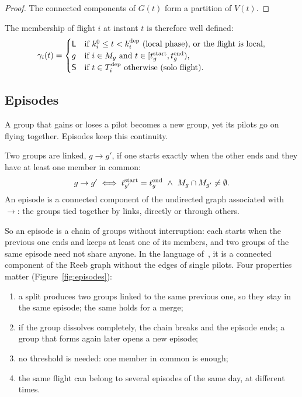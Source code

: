 \begin{proof}
The connected components of $G(t)$ form a partition of $V(t)$.
\end{proof}

The membership of flight $i$ at instant $t$ is therefore well defined:
\begin{equation}\label{eq:membership}
  \gamma_i(t)=\begin{cases}
    \textsf{L} & \text{if } k^0_i\le t<k^{\mathrm{dep}}_i \text{ (local phase), or the flight is local},\\
    g & \text{if } i\in M_g \text{ and } t\in[t^{\rm start}_g,t^{\rm end}_g),\\
    \textsf{S} & \text{if } t\in T^{\mathrm{dep}}_i \text{ otherwise (solo flight).}
  \end{cases}
\end{equation}

\subsection{Episodes}\label{sec:episodes}

A group that gains or loses a pilot becomes a new group, yet its pilots go on flying together.
Episodes keep this continuity.

\begin{definition}[episode]
Two groups are linked, $g\to g'$, if one starts exactly when the other ends and they have at
least one member in common:
\begin{equation}\label{eq:link}
  g\to g' \iff t^{\rm start}_{g'}=t^{\rm end}_g\ \wedge\ M_g\cap M_{g'}\ne\emptyset .
\end{equation}
An episode is a connected component of the undirected graph associated with $\to$: the groups
tied together by links, directly or through others.
\end{definition}

So an episode is a chain of groups without interruption: each starts when the previous one ends
and keeps at least one of its members, and two groups of the same episode need not share anyone.
In the language of~\cite{buchin2015}, it is a connected component of the Reeb graph without the
edges of single pilots. Four properties matter (Figure~\ref{fig:episodes}):
\begin{enumerate}[label=(\roman*)]
  \item a split produces two groups linked to the same previous one, so they stay in the same
        episode; the same holds for a merge;
  \item if the group dissolves completely, the chain breaks and the episode ends; a group that
        forms again later opens a new episode;
  \item no threshold is needed: one member in common is enough;
  \item the same flight can belong to several episodes of the same day, at different times.
\end{enumerate}

